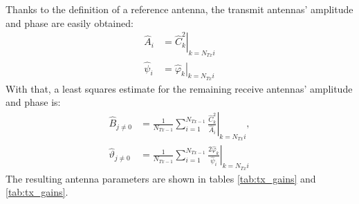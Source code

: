 Thanks to the definition of a reference antenna,
the transmit antennas' amplitude and phase are easily obtained:
\begin{align}
  \hat A_i    & = \left.\hat C_k^2 \right|_{k=N_{Tx}i}     \\
  \hat \psi_i & = \left.\hat \varphi_k \right|_{k=N_{Tx}i}
\end{align}
With that, a least squares estimate for the remaining receive antennas' amplitude and phase is:
\begin{align}
  \hat B_{j\neq0}         & = \frac{1}{N_{Tx-1}} \sum_{i=1}^{N_{Tx-1}} \left. \frac{\hat C_k^2}{\hat A_i} \right|_{k=N_{Tx}i},        \\
  \hat \vartheta_{j\neq0} & = \frac{1}{N_{Tx-1}} \sum_{i=1}^{N_{Tx-1}} \left. \frac{2\hat \varphi_k}{\hat \psi_i} \right|_{k=N_{Tx}i}
\end{align}
The resulting antenna parameters are shown in tables \ref{tab:tx_gains} and \ref{tab:tx_gains}.
